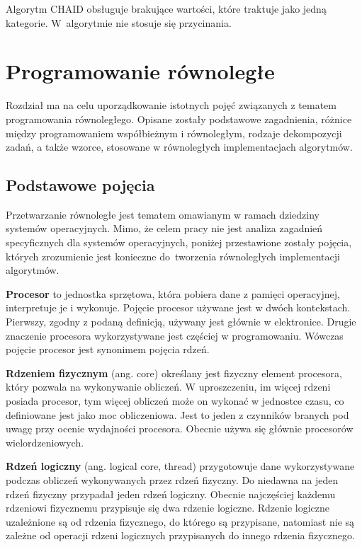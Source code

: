 \documentclass[12pt]{article}
\begin{document}
Algorytm CHAID obsługuje brakujące wartości, które traktuje jako jedną kategorie. W~algorytmie nie stosuje się przycinania.

\newpage
\section{Programowanie równoległe}
Rozdział ma na celu uporządkowanie istotnych pojęć związanych z tematem programowania
równoległego. Opisane zostały podstawowe zagadnienia, różnice między programowaniem współbieżnym
i równoległym, rodzaje dekompozycji zadań, a także wzorce, stosowane w równoległych 
implementacjach algorytmów.

\subsection{Podstawowe pojęcia}
Przetwarzanie równoległe jest tematem omawianym w ramach dziedziny systemów operacyjnych.
Mimo, że celem pracy nie jest analiza zagadnień specyficznych dla systemów operacyjnych,
poniżej przestawione zostały pojęcia, których zrozumienie jest konieczne do~tworzenia 
równoległych implementacji algorytmów.

\textbf{Procesor} to jednostka sprzętowa, która pobiera dane z pamięci operacyjnej, interpretuje je
i wykonuje. Pojęcie procesor używane jest w dwóch kontekstach. Pierwszy, zgodny z podaną definicją, używany
jest głównie w elektronice. Drugie znaczenie procesora wykorzystywane jest częściej w programowaniu.
Wówczas pojęcie procesor jest synonimem pojęcia rdzeń.

\textbf{Rdzeniem fizycznym} (ang. core) określany jest fizyczny element procesora, który pozwala na wykonywanie obliczeń.
W uproszczeniu, im więcej rdzeni posiada procesor, tym więcej obliczeń może on wykonać w jednostce czasu, co definiowane
jest jako moc obliczeniowa. Jest to jeden z czynników branych pod uwagę przy ocenie wydajności procesora. Obecnie używa się
głównie procesorów wielordzeniowych.

\textbf{Rdzeń logiczny} (ang. logical core, thread) przygotowuje dane wykorzystywane podczas obliczeń wykonywanych przez rdzeń fizyczny.
Do niedawna na jeden rdzeń fizyczny przypadał jeden rdzeń logiczny.
Obecnie najczęściej każdemu rdzeniowi fizycznemu przypisuje się dwa rdzenie logiczne.
Rdzenie logiczne uzależnione są od rdzenia fizycznego, do którego są przypisane, natomiast nie są zależne
od operacji rdzeni logicznych przypisanych do innego rdzenia fizycznego.
\end{document}
